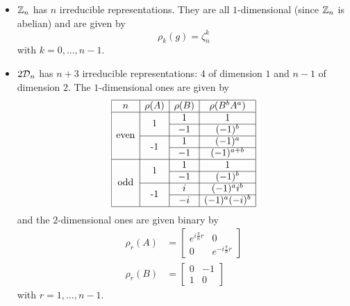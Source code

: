             \begin{itemize}
                \item $\mathbb{Z}_n$ has $n$ irreducible representations. They are all $1$-dimensional (since $\mathbb{Z}_n$ is abelian) and are given by
                \begin{equation}
                    \rho_k(g)=\zeta^k_n
                \end{equation}
                with $k=0,\dots,n-1$.
                \item $2\mathcal{D}_n$ has $n+3$ irreducible representations: $4$ of dimension $1$ and $n-1$ of dimension $2$. The $1$-dimensional ones are given by
                \begin{equation*}
                \begin{array}{|c|c|c|c|}
                    \hline
                    n & \rho(A) & \rho(B) & \rho(B^bA^a) \\
                    \hline
                    \multirow[c]{4}{*}{\text{even}} & \multirow[c]{2}{*}{1} & 1 & 1 \\ \cline{3-4}
                    & & -1 & (-1)^b \\ \cline{2-4}
                    & \multirow[c]{2}{*}{-1} & 1 & (-1)^a \\ \cline{3-4}
                    & & -1 & (-1)^{a+b} \\
                    \hline
                    \multirow[c]{4}{*}{\text{odd}} & \multirow[c]{2}{*}{1} & 1 & 1 \\ \cline{3-4}
                    & & -1 & (-1)^b \\ \cline{2-4}
                    & \multirow[c]{2}{*}{-1} & i & (-1)^ai^b \\ \cline{3-4}
                    & & -i & (-1)^a(-i)^b \\
                    \hline
                \end{array}
                \end{equation*}
                and the $2$-dimensional ones are given binary by
                \begin{align*}
                    \rho_r(A) &= 
                    \begin{bmatrix}
                        e^{i\frac{\pi}{n}r} & 0\\
                        0 & e^{-i\frac{\pi}{n}r} 
                    \end{bmatrix}\\
                    \rho_r(B) &= 
                    \begin{bmatrix}
                        0 & -1 \\
                        1 & 0
                    \end{bmatrix}
                \end{align*}
                with $r=1,\dots,n-1$.
            \end{itemize}

